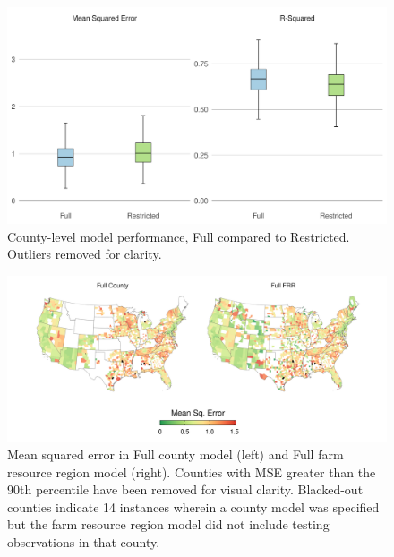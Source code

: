 \documentclass[12pt]{article}
\begin{document}
\begin{figure}[H]
    \centering
    \includegraphics[width=1\textwidth]{exhibits/county_compare_boxplot.png}
    \caption{County-level model performance, Full compared to Restricted. Outliers removed for clarity.}
    \label{fig:county_compare_boxplot}
\end{figure}

\begin{figure}[H]
    \centering
    \includegraphics[width=1\textwidth]{exhibits/compare_ffb_fcb_mse.png}
    \caption{Mean squared error in Full county model (left) and Full farm resource region model (right). Counties with MSE greater than the 90th percentile have been removed for visual clarity. Blacked-out counties indicate 14 instances wherein a county model was specified but the farm resource region model did not include testing observations in that county.}
    \label{fig:compare_ffb_fcb_mse}
\end{figure}
\end{document}
